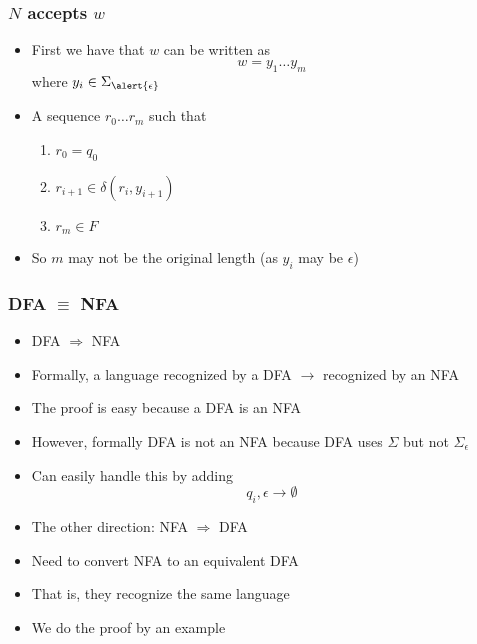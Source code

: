 \begin{frame}[allowframebreaks] \frametitle{$N$ accepts $w$}
  \begin{itemize}
\item First we have that $w$ can be written as 
  \begin{equation*}
    w = y_1 \ldots y_m
  \end{equation*}
where $y_i \in \Sigma_{\alert{\epsilon}}$
\item A sequence $r_0 \ldots r_m$ such that

  \begin{enumerate}
  \item $r_0=q_0$
  \item $r_{i+1}\in \delta(r_i,y_{i+1})$
  \item $r_m\in F$
  \end{enumerate}
\item So $m$ may not be the original length (as $y_i$ may be
  $\epsilon$)
\end{itemize}\end{frame} \begin{frame}[allowframebreaks] \frametitle{DFA $\equiv$ NFA}
  \begin{itemize}
\item DFA $\Rightarrow$ NFA

\item Formally, a language recognized by a DFA $\rightarrow$
  recognized by an NFA

\item The proof is easy because a DFA is an NFA
\item However, \alert{formally DFA is not an NFA}
because DFA uses $\Sigma$ but not $\Sigma_\epsilon$

\item [] Can easily handle this by adding
  \begin{equation*}
  q_i, \epsilon \rightarrow \emptyset
\end{equation*}
\item The other direction: NFA $\Rightarrow $ DFA

\item Need to convert NFA to an equivalent DFA
\item [] That is, they recognize the same language
\item We do the proof by an example
\end{itemize}\end{frame}

